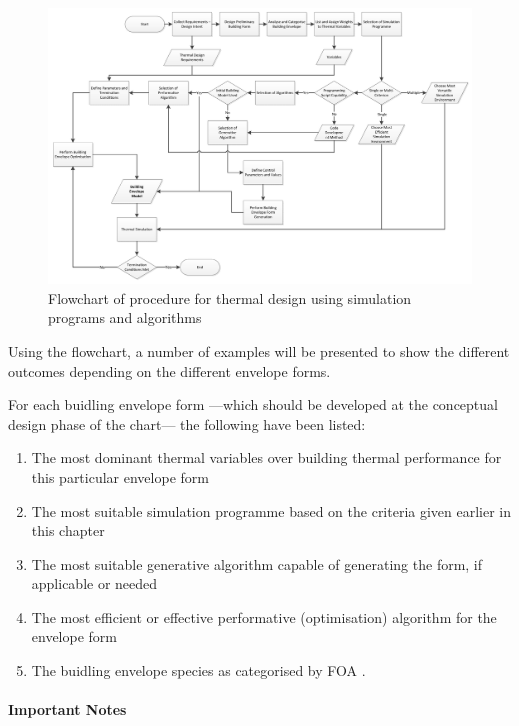 \begin{figure}
	\centering
	\includegraphics[width=21cm]{./Images/9-Flowchart}
	\caption[Thermal Algorithmic Design Flowchart]{Flowchart of procedure for thermal design using simulation programs and algorithms}
	\label{fig:Ch5Flowchart}
\end{figure}

Using the flowchart, a number of examples will be presented to show the different outcomes depending on the different envelope forms.

For each buidling envelope form ---which should be developed at the conceptual design phase of the chart--- the following have been listed:

\vspace{-0.4cm}
\begin{enumerate}
	\item The most dominant thermal variables over building thermal performance for this particular envelope form
	\item The most suitable simulation programme based on the criteria given earlier in this chapter
	\item The most suitable generative algorithm capable of generating the form, if applicable or needed
	\item The most efficient or effective performative (optimisation) algorithm for the envelope form
	\item The buidling envelope species as categorised by FOA \cite{foa04}.
\end{enumerate}

\paragraph{Important Notes}\mbox{}


